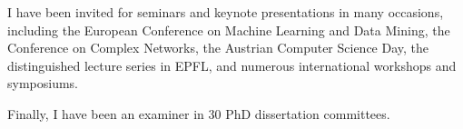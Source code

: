 \documentclass[a4paper,11pt]{article}
\begin{document}
I have been invited for seminars and keynote presentations in many occasions, 
including 
the European Conference on Machine Learning and Data Mining, 
the Conference on Complex Networks, 
the Austrian Computer Science Day, 
the distinguished lecture series in EPFL, 
and numerous international workshops and symposiums.

Finally, I have been an examiner in 30 PhD dissertation committees.
\end{document}
